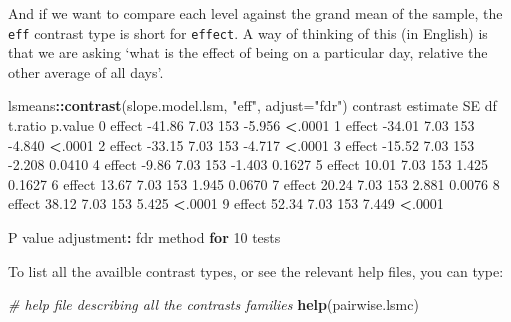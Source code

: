 \documentclass[]{article}
\newenvironment{Shaded}{\begin{snugshade}}{\end{snugshade}}
\newcommand{\CommentTok}[1]{\textcolor[rgb]{0.56,0.35,0.01}{\textit{#1}}}
\newcommand{\ControlFlowTok}[1]{\textcolor[rgb]{0.13,0.29,0.53}{\textbf{#1}}}
\newcommand{\DataTypeTok}[1]{\textcolor[rgb]{0.13,0.29,0.53}{#1}}
\newcommand{\DecValTok}[1]{\textcolor[rgb]{0.00,0.00,0.81}{#1}}
\newcommand{\FloatTok}[1]{\textcolor[rgb]{0.00,0.00,0.81}{#1}}
\newcommand{\KeywordTok}[1]{\textcolor[rgb]{0.13,0.29,0.53}{\textbf{#1}}}
\newcommand{\NormalTok}[1]{#1}
\newcommand{\OperatorTok}[1]{\textcolor[rgb]{0.81,0.36,0.00}{\textbf{#1}}}
\newcommand{\StringTok}[1]{\textcolor[rgb]{0.31,0.60,0.02}{#1}}
\begin{document}
And if we want to compare each level against the grand mean of the sample, the
\texttt{eff} contrast type is short for \texttt{effect}. A way of thinking of this (in
English) is that we are asking `what is the effect of being on a particular day,
relative the other average of all days'.

\begin{Shaded}
\begin{Highlighting}[]
\NormalTok{lsmeans}\OperatorTok{::}\KeywordTok{contrast}\NormalTok{(slope.model.lsm, }\StringTok{"eff"}\NormalTok{, }\DataTypeTok{adjust=}\StringTok{"fdr"}\NormalTok{)}
\NormalTok{ contrast estimate   SE  df t.ratio p.value}
 \DecValTok{0}\NormalTok{ effect   }\FloatTok{-41.86} \FloatTok{7.03} \DecValTok{153} \FloatTok{-5.956}  \OperatorTok{<}\NormalTok{.}\DecValTok{0001} 
 \DecValTok{1}\NormalTok{ effect   }\FloatTok{-34.01} \FloatTok{7.03} \DecValTok{153} \FloatTok{-4.840}  \OperatorTok{<}\NormalTok{.}\DecValTok{0001} 
 \DecValTok{2}\NormalTok{ effect   }\FloatTok{-33.15} \FloatTok{7.03} \DecValTok{153} \FloatTok{-4.717}  \OperatorTok{<}\NormalTok{.}\DecValTok{0001} 
 \DecValTok{3}\NormalTok{ effect   }\FloatTok{-15.52} \FloatTok{7.03} \DecValTok{153} \FloatTok{-2.208}  \FloatTok{0.0410} 
 \DecValTok{4}\NormalTok{ effect    }\FloatTok{-9.86} \FloatTok{7.03} \DecValTok{153} \FloatTok{-1.403}  \FloatTok{0.1627} 
 \DecValTok{5}\NormalTok{ effect    }\FloatTok{10.01} \FloatTok{7.03} \DecValTok{153}  \FloatTok{1.425}  \FloatTok{0.1627} 
 \DecValTok{6}\NormalTok{ effect    }\FloatTok{13.67} \FloatTok{7.03} \DecValTok{153}  \FloatTok{1.945}  \FloatTok{0.0670} 
 \DecValTok{7}\NormalTok{ effect    }\FloatTok{20.24} \FloatTok{7.03} \DecValTok{153}  \FloatTok{2.881}  \FloatTok{0.0076} 
 \DecValTok{8}\NormalTok{ effect    }\FloatTok{38.12} \FloatTok{7.03} \DecValTok{153}  \FloatTok{5.425}  \OperatorTok{<}\NormalTok{.}\DecValTok{0001} 
 \DecValTok{9}\NormalTok{ effect    }\FloatTok{52.34} \FloatTok{7.03} \DecValTok{153}  \FloatTok{7.449}  \OperatorTok{<}\NormalTok{.}\DecValTok{0001} 

\NormalTok{P value adjustment}\OperatorTok{:}\StringTok{ }\NormalTok{fdr method }\ControlFlowTok{for} \DecValTok{10}\NormalTok{ tests }
\end{Highlighting}
\end{Shaded}

To list all the availble contrast types, or see the relevant help files, you can
type:

\begin{Shaded}
\begin{Highlighting}[]
\CommentTok{# help file describing all the contrasts families}
\KeywordTok{help}\NormalTok{(pairwise.lsmc)}
\end{Highlighting}
\end{Shaded}
\end{document}
